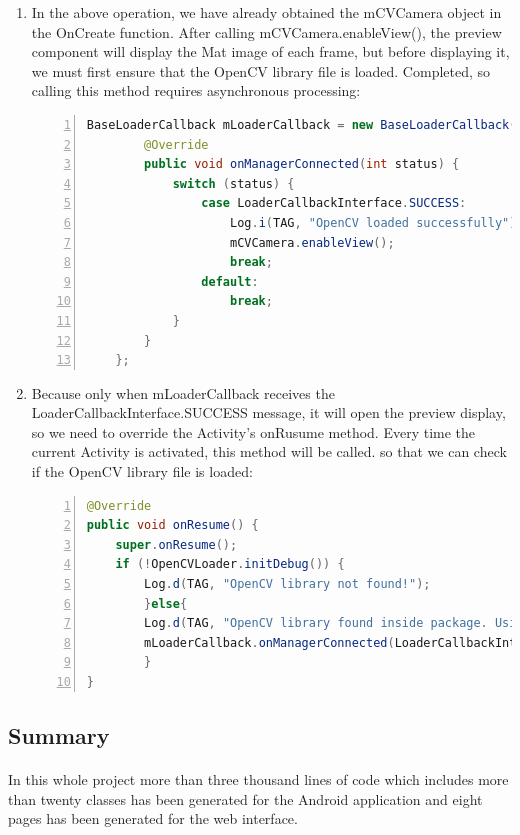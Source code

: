 \begin{enumerate}
\begin{lstlisting}[language={java},
        numbers=left,basicstyle=\small\ttfamily,breaklines=true]
@Override
public void onCameraViewStopped() {
    mRgba.release();
}

@Override
public Mat onCameraFrame(CameraBridgeViewBase.CvCameraViewFrame inputFrame) {
    if( Cur_State  == 1 && imageReady ) {
        if (tag){
            this.runOnUiThread(new Runnable() {
                public void run() {
                    final Toast toast = Toast.makeText(thisContext, "find it!!!" , Toast.LENGTH_SHORT);
                    toast.show();
                }
            });
        }
        return  compareKeypoints(inputFrame);
    } else {
        return inputFrame.rgba();
    }
  }
\end{lstlisting}
\item[5)]In the above operation, we have already obtained the mCVCamera object in the OnCreate function. After calling mCVCamera.enableView(), the preview component will display the Mat image of each frame, but before displaying it, we must first ensure that the OpenCV library file is loaded. Completed, so calling this method requires asynchronous processing:
\begin{lstlisting}[language={java},
        numbers=left,basicstyle=\small\ttfamily,breaklines=true] 
BaseLoaderCallback mLoaderCallback = new BaseLoaderCallback(this) {
        @Override
        public void onManagerConnected(int status) {
            switch (status) {
                case LoaderCallbackInterface.SUCCESS:
                    Log.i(TAG, "OpenCV loaded successfully");
                    mCVCamera.enableView();
                    break;
                default:
                    break;
            }
        }
    };
\end{lstlisting}
\item[6)] Because only when mLoaderCallback receives the LoaderCallbackInterface.SUCCESS message, it will open the preview display, so we need to override the Activity's onRusume method. Every time the current Activity is activated, this method will be called. so that we can check if the OpenCV library file is loaded:
\begin{lstlisting}[language={java},
        numbers=left,basicstyle=\small\ttfamily,breaklines=true] 
@Override
public void onResume() {
    super.onResume();
    if (!OpenCVLoader.initDebug()) {
        Log.d(TAG, "OpenCV library not found!");
        }else{
        Log.d(TAG, "OpenCV library found inside package. Using it!");
        mLoaderCallback.onManagerConnected(LoaderCallbackInterface.SUCCESS);
        }
}
\end{lstlisting}
\end{enumerate}
\subsection{Summary}
\paragraph{} In this whole project more than three thousand lines of code which includes more than twenty classes has been generated for the Android application and eight pages has been generated for the web interface. 